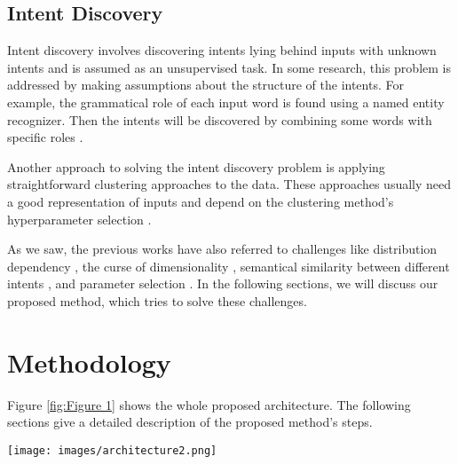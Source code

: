 \documentclass{article}
\begin{document}
\subsection{Intent Discovery}

\noindent Intent discovery involves discovering intents lying behind inputs with unknown intents and is assumed as an unsupervised task. 
In some research, this problem is addressed by making assumptions about the structure of the intents. 
For example, the grammatical role of each input word is found using a named entity recognizer. 
Then the intents will be discovered by combining some words with specific roles \citep{10.1145/3366423.3380268,zeng2021automatic}.

Another approach to solving the intent discovery problem is applying straightforward clustering approaches to the data. 
These approaches usually need a good representation of inputs and depend on the clustering method's hyperparameter selection \citep{padmasundari2018intent,zhang2021discovering}.

As we saw, the previous works have also referred to challenges like distribution dependency \citep{zhan-etal-2021-scope}, the curse of dimensionality \citep{padmasundari2018intent}, 
semantical similarity between different intents \citep{lin-xu-2019-deep}, and parameter selection \citep{zhang2021discovering}. 
In the following sections, we will discuss our proposed method, which tries to solve these challenges.

\section{Methodology}\label{methodology}

\noindent Figure \ref{fig:Figure 1} shows the whole proposed architecture.
The following sections give a detailed description of the proposed method's steps.

\begin{figure*}[ht!]
	\centering
	\texttt{[image: images/architecture2.png]}
	\caption{This figure shows the whole flow of the proposed architecture. 
			In the first step, the fine-tuned BERT encoder gets utterance $u$ and passes its representation $x$ to the VAE. 
			Then, the reconstruction $x'$ is generated, and the loss $l$ between $x$ and $x'$ is computed. 
			Suppose $l$ is lower than a threshold $t$. 
			In that case, $u$ will be considered in-domain input, 
			and the related representation $x$ is passed to the simple one-layer neural network classifier to predict its label. 
			Otherwise, $x$ will be passed to the K-PCA dimensionality reduction component, 
			and the HDBSCAN clustering algorithm will predict the resulting vector's pseudo label (or cluster).}
	\label{fig:Figure 1}
  \end{figure*}
\end{document}
